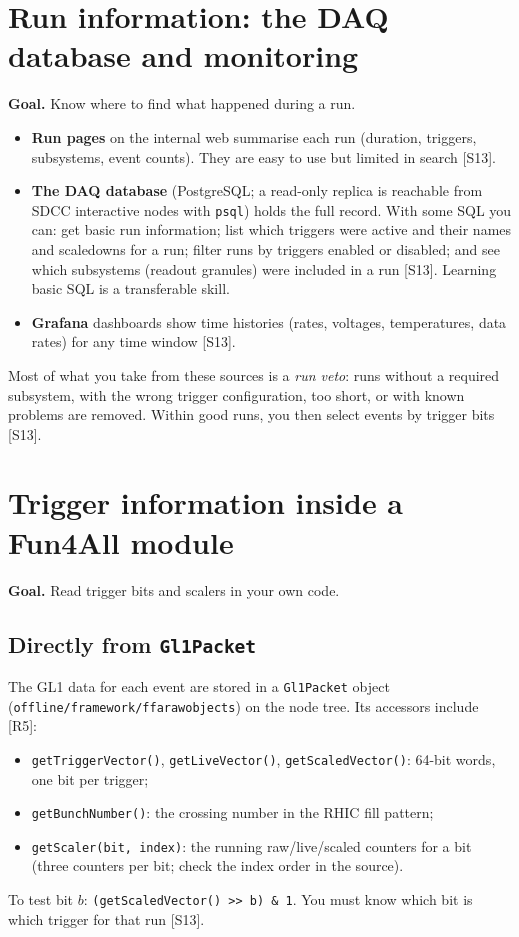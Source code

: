 \documentclass[11pt,letterpaper]{article}
\newcommand{\goal}[1]{\par\noindent\textbf{Goal.} #1\par\smallskip}
\newcommand{\code}[1]{\texttt{#1}}
\begin{document}
\section{Run information: the DAQ database and monitoring}\label{sec:db}
\goal{Know where to find what happened during a run.}
\begin{itemize}
\item \textbf{Run pages} on the internal web summarise each run (duration, triggers, subsystems, event counts). They are easy to use but limited in search [S13].
\item \textbf{The DAQ database} (PostgreSQL; a read-only replica is reachable from SDCC interactive nodes with \code{psql}) holds the full record. With some SQL you can: get basic run information; list which triggers were active and their names and scaledowns for a run; filter runs by triggers enabled or disabled; and see which subsystems (readout granules) were included in a run [S13]. Learning basic SQL is a transferable skill.
\item \textbf{Grafana} dashboards show time histories (rates, voltages, temperatures, data rates) for any time window [S13].
\end{itemize}
Most of what you take from these sources is a \emph{run veto}: runs without a required subsystem, with the wrong trigger configuration, too short, or with known problems are removed. Within good runs, you then select events by trigger bits [S13].

\section{Trigger information inside a Fun4All module}\label{sec:f4a}
\goal{Read trigger bits and scalers in your own code.}

\subsection{Directly from \code{Gl1Packet}}
The GL1 data for each event are stored in a \code{Gl1Packet} object (\code{offline/framework/ffarawobjects}) on the node tree. Its accessors include [R5]:
\begin{itemize}
\item \code{getTriggerVector()}, \code{getLiveVector()}, \code{getScaledVector()}: 64-bit words, one bit per trigger;
\item \code{getBunchNumber()}: the crossing number in the RHIC fill pattern;
\item \code{getScaler(bit, index)}: the running raw/live/scaled counters for a bit (three counters per bit; check the index order in the source).
\end{itemize}
To test bit $b$: \code{(getScaledVector() >> b) \& 1}. You must know which bit is which trigger for that run [S13].
\end{document}
